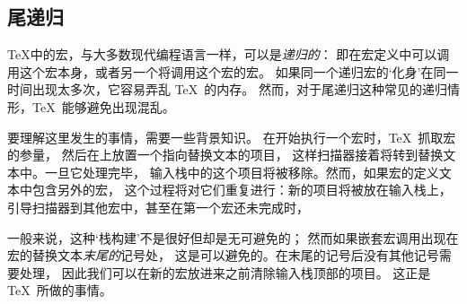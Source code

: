 \documentclass{book}
\begin{document}
\subsection{尾递归}

\TeX 中的宏，与大多数现代编程语言一样，可以是\emph{递归的}：
即在宏定义中可以调用这个宏本身，或者另一个将调用这个宏的宏。
如果同一个递归宏的`化身'在同一时间出现太多次，它容易弄乱 \TeX\ 的内存。
然而，对于尾递归这种常见的递归情形，\TeX\ 能够避免出现混乱。

要理解这里发生的事情，需要一些背景知识。
在开始执行一个宏时，\TeX\ 抓取宏的参量，
然后在上放置一个指向替换文本的项目，
这样扫描器接着将转到替换文本中。一旦它处理完毕，
输入栈中的这个项目将被移除。然而，如果宏的定义文本中包含另外的宏，
这个过程将对它们重复进行：新的项目将被放在输入栈上，
引导扫描器到其他宏中，甚至在第一个宏还未完成时，

一般来说，这种`栈构建'不是很好但却是无可避免的；
然而如果嵌套宏调用出现在宏的替换文本{\em 末尾的}记号处，
这是可以避免的。在末尾的记号后没有其他记号需要处理，
因此我们可以在新的宏放进来之前清除输入栈顶部的项目。
这正是 \TeX\ 所做的事情。
\end{document}
